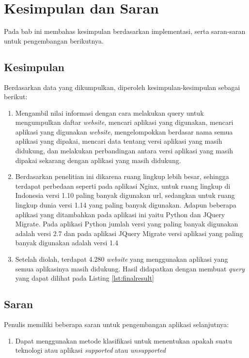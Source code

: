 \chapter{Kesimpulan dan Saran}
\label{chap:kesimpulan_dan_saran}

Pada bab ini membahas kesimpulan berdasarkan implementasi, serta saran-saran untuk pengembangan berikutnya.

\section{Kesimpulan}
Berdasarkan data yang dikumpulkan, diperoleh kesimpulan-kesimpulan sebagai berikut:
\begin{enumerate}
	\item Mengambil nilai informasi dengan cara melakukan query untuk mengumpulkan daftar \textit{website}, mencari aplikasi yang digunakan, mencari aplikasi yang digunakan \textit{website}, mengelompokkan berdasar nama semua aplikasi yang dipakai, mencari data tentang versi aplikasi yang masih didukung, dan melakukan perbandingan antara versi aplikasi yang masih dipakai sekarang dengan aplikasi yang masih didukung.
	\item Berdasarkan penelitian ini dikarena ruang lingkup lebih besar, sehingga terdapat perbedaan seperti pada aplikasi Nginx, untuk ruang lingkup di Indonesia versi 1.10 paling banyak digunakan url, sedangkan untuk ruang lingkup dunia versi 1.14 yang paling banyak digunakan. Adapun beberapa aplikasi yang ditambahkan pada aplikasi ini yaitu Python dan JQuery Migrate. Pada aplikasi Python jumlah versi yang paling banyak digunakan adalah versi 2.7 dan pada aplikasi JQuery Migrate versi aplikasi yang paling banyak digunakan adalah versi 1.4
	\item Setelah diolah, terdapat 4.280 \textit{website} yang menggunakan aplikasi yang semua aplikasinya masih didukung. Hasil didapatkan dengan membuat \textit{query} yang dapat dilihat pada Listing \ref{lst:finalresult}
\end{enumerate}

\section{Saran}
Penulis memiliki beberapa saran untuk pengembangan aplikasi selanjutnya:
\begin{enumerate}
	\item Dapat menggunakan metode klasifikasi untuk menentukan apakah suatu teknologi atau aplikasi \textit{supported} atau \textit{unsupported}
\end{enumerate}